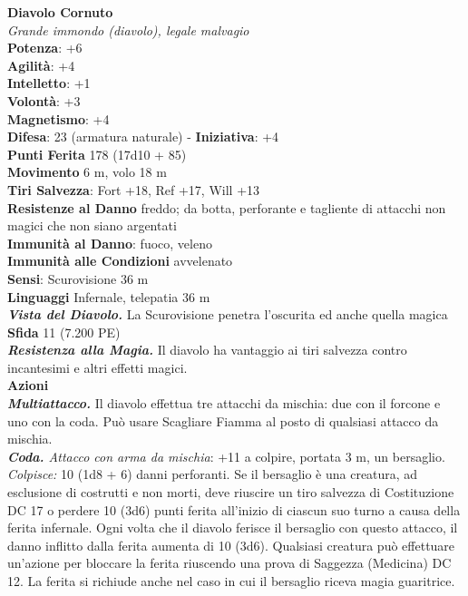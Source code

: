 \begin{multicols}{2}
\medskip\textbf{Diavolo Cornuto}\\
\emph{Grande immondo (diavolo), legale malvagio}\\
\textbf{Potenza}: +6\\
\textbf{Agilità}: +4\\
\textbf{Intelletto}: +1\\
\textbf{Volontà}: +3\\
\textbf{Magnetismo}: +4\\
\textbf{Difesa}: 23 (armatura naturale) - \textbf{Iniziativa}: +4\\
\textbf{Punti Ferita} 178 (17d10 + 85)\\
\textbf{Movimento} 6 m, volo 18 m\\
\textbf{Tiri Salvezza}: Fort +18, Ref +17, Will +13\\
\textbf{Resistenze al Danno} freddo; da botta, perforante e tagliente di attacchi non magici che non siano argentati\\
\textbf{Immunità al Danno}: fuoco, veleno\\
\textbf{Immunità alle Condizioni} avvelenato\\
\textbf{Sensi}: Scurovisione 36 m\\
\textbf{Linguaggi} Infernale, telepatia 36 m \\
\emph{\textbf{Vista del Diavolo.}} La Scurovisione penetra l'oscurita ed anche quella magica\\
\textbf{Sfida} 11 (7.200 PE)\smallskip\\
\emph{\textbf{Resistenza alla Magia.}} Il diavolo ha vantaggio ai tiri salvezza contro incantesimi e altri effetti magici.\\
\smallskip\textbf{Azioni}\\
\emph{\textbf{Multiattacco.}} Il diavolo effettua tre attacchi da mischia: due con il forcone e uno con la coda. Può usare Scagliare Fiamma al posto di qualsiasi attacco da mischia.\\
\emph{\textbf{Coda.} Attacco con arma da mischia}: +11 a colpire, portata 3 m, un bersaglio.\\
\emph{Colpisce:} 10 (1d8 + 6) danni perforanti. Se il bersaglio è una creatura, ad esclusione di costrutti e non morti, deve riuscire un tiro salvezza di Costituzione DC 17 o perdere 10 (3d6) punti ferita all'inizio di ciascun suo turno a causa della ferita infernale. Ogni volta che il diavolo ferisce il bersaglio con questo attacco, il danno inflitto dalla ferita aumenta di 10 (3d6). Qualsiasi creatura può effettuare un'azione per bloccare la ferita riuscendo una prova di Saggezza (Medicina) DC 12. La ferita si richiude anche nel caso in cui il bersaglio riceva magia guaritrice.\\

\end{multicols}

